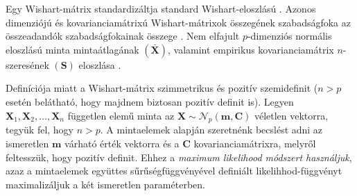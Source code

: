 \documentclass[DIV=15,appendixprefix]{scrreprt}
\theoremstyle{definition}
\theoremstyle{remark}
\newcommand{\normald}{\mathcal{N}}
\begin{document}
Egy Wishart-mátrix standardizáltja standard Wishart-eloszlású \cite[5. fejezet, 4. szakasz, 4.1.
tétel]{BollaKramli}. Azonos dimenziójú és kovarianciamátrixú Wishart-mátrixok összegének
szabadságfoka az összeadandók szabadságfokainak összege \cite[5. fejezet, 4. szakasz, 4.2.
állítás]{BollaKramli}. Nem elfajult $ p $-dimenziós normális eloszlású minta mintaátlagának $ \left(
\bar{ \mathbf{ X } } \right) $, valamint empirikus kovarianciamátrix $ n $-szeresének $ \left(
\mathbf{ S } \right) $ eloszlása \cite[5. fejezet, 4. szakasz, 4.3. tétel]{BollaKramli}.

Definíciója miatt a Wishart-mátrix szimmetrikus és pozitív szemidefinit ($ n > p $ esetén belátható,
hogy majdnem biztosan pozitív definit is).
%
Legyen $ \mathbf{ X }_{ 1 },{} \mathbf{ X }_{ 2 },{} \ldots,{} \mathbf{ X }_{ n } $ független elemű
minta az $ \mathbf{ X } \sim \normald_{ p } \left( \mathbf{ m },{} \mathbf{ C } \right) $ véletlen
vektorra, tegyük fel, hogy $ n > p $. A mintaelemek alapján szeretnénk becslést adni az ismeretlen
$ \mathbf{ m } $ várható érték vektorra és a $ \mathbf{ C } $ kovarianciamátrixra, melyről
feltesszük, hogy pozitív definit. Ehhez a \emph{maximum likelihood módszert használjuk}, azaz a
mintaelemek együttes sűrűségfüggvényével definiált likelihhod-függvényt maximalizáljuk a két
ismeretlen paraméterben.
\end{document}
